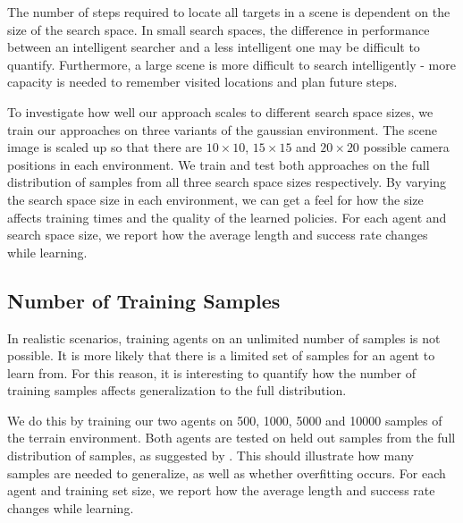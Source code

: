 The number of steps required to locate all targets in a scene is dependent on the size of the search space.
In small search spaces, the difference in performance between an intelligent searcher and a less intelligent one may be difficult to quantify.
Furthermore, a large scene is more difficult to search intelligently - more capacity is needed to remember visited locations and plan future steps.

To investigate how well our approach scales to different search space sizes, we train our approaches on three variants of the gaussian environment.
The scene image is scaled up so that there are \(10 \times 10\), \(15 \times 15\) and \(20 \times 20\) possible camera positions in each environment.
We train and test both approaches on the full distribution of samples from all three search space sizes respectively.
By varying the search space size in each environment, we can get a feel for how the size affects training times and the quality of the learned policies.
For each agent and search space size, we report how the average length and success rate changes while learning.

\subsection{Number of Training Samples}

In realistic scenarios, training agents on an unlimited number of samples is not possible.
It is more likely that there is a limited set of samples for an agent to learn from.
For this reason, it is interesting to quantify how the number of training samples affects generalization to the full distribution.

We do this by training our two agents on 500, 1000, 5000 and 10000 samples of the terrain environment.
Both agents are tested on held out samples from the full distribution of samples, as suggested by \cite{cobbe_leveraging_2020}.
This should illustrate how many samples are needed to generalize, as well as whether overfitting occurs.
For each agent and training set size, we report how the average length and success rate changes while learning.

%

